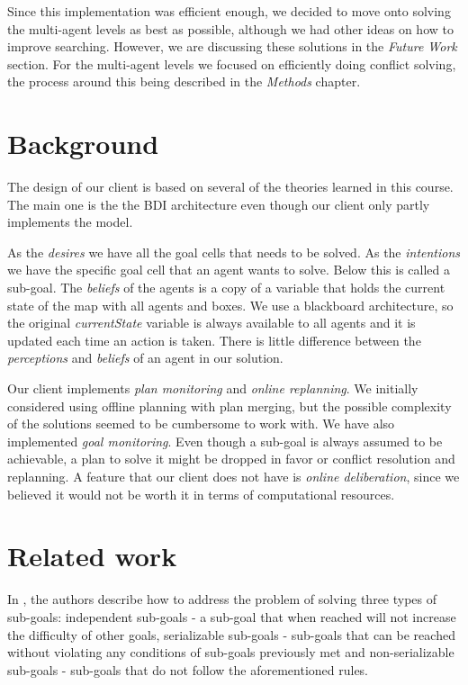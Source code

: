 \documentclass[letterpaper]{article}
\begin{document}
Since this implementation was efficient enough, we decided to move onto solving the multi-agent levels as best as possible, although we had other ideas on how to improve searching. However, we are discussing these solutions in the \textit{Future Work} section. For the multi-agent levels we focused on efficiently doing conflict solving, the process around this being described in the \textit{Methods} chapter.

\section{Background}
The design of our client is based on several of the theories learned in this course. The main one is the the BDI architecture even though our client only partly implements the model. 

As the \textit{desires} we have all the goal cells that needs to be solved. As the \textit{intentions} we have the specific goal cell that an agent wants to solve. Below this is called a sub-goal. The \textit{beliefs} of the agents is a copy of a variable that holds the current state of the map with all agents and boxes. We use a blackboard architecture, so the original \textit{currentState} variable is always available to all agents and it is updated each time an action is taken. There is little difference between the \textit{perceptions} and \textit{beliefs} of an agent in our solution.

Our client implements \textit{plan monitoring} and \textit{online replanning}. We initially considered using offline planning with plan merging, but the possible complexity of the solutions seemed to be cumbersome to work with. We have also implemented \textit{goal monitoring}. Even though a sub-goal is always assumed to be achievable, a plan to solve it might be dropped in favor or conflict resolution and replanning. A feature that our client does not have is \textit{online deliberation}, since we believed it would not be worth it in terms of computational resources. 

\section{Related work}
In \cite{recursiveSubgoals}, the authors describe how to address the problem of solving three types of sub-goals: independent sub-goals - a sub-goal that when reached will not increase the difficulty of other goals, serializable sub-goals - sub-goals that can be reached without violating any conditions of sub-goals previously met and non-serializable sub-goals - sub-goals that do not follow the aforementioned rules.
\end{document}
